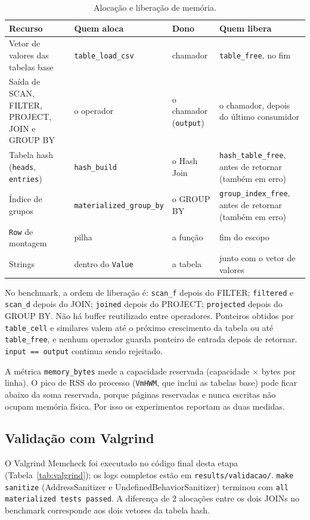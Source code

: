 \documentclass[11pt,a4paper]{article}
\begin{document}
\begin{table}[H]
\centering
\small
\begin{tabular}{@{}p{4.2cm}p{3.6cm}p{2.9cm}p{4.6cm}@{}}
\toprule
Recurso & Quem aloca & Dono & Quem libera \\
\midrule
Vetor de valores das tabelas base & \texttt{table\_load\_csv} & chamador & \texttt{table\_free}, no fim \\
Saída de SCAN, FILTER, PROJECT, JOIN e GROUP BY & o operador & o chamador (\texttt{output}) & o chamador, depois do último consumidor \\
Tabela hash (\texttt{heads}, \texttt{entries}) & \texttt{hash\_build} & o Hash Join & \texttt{hash\_table\_free}, antes de retornar (também em erro) \\
Índice de grupos & \texttt{materialized\_\allowbreak group\_by} & o GROUP BY & \texttt{group\_index\_free}, antes de retornar (também em erro) \\
\texttt{Row} de montagem & pilha & a função & fim do escopo \\
Strings & dentro do \texttt{Value} & a tabela & junto com o vetor de valores \\
\bottomrule
\end{tabular}
\caption{Alocação e liberação de memória.}
\label{tab:posse}
\end{table}

No benchmark, a ordem de liberação é: \texttt{scan\_f} depois do FILTER; \texttt{filtered} e \texttt{scan\_d} depois do JOIN; \texttt{joined} depois do PROJECT; \texttt{projected} depois do GROUP BY. Não há buffer reutilizado entre operadores. Ponteiros obtidos por \texttt{table\_cell} e similares valem até o próximo crescimento da tabela ou até \texttt{table\_free}, e nenhum operador guarda ponteiro de entrada depois de retornar. \texttt{input == output} continua sendo rejeitado.

A métrica \texttt{memory\_bytes} mede a capacidade reservada (capacidade $\times$ bytes por linha). O pico de RSS do processo (\texttt{VmHWM}, que inclui as tabelas base) pode ficar abaixo da soma reservada, porque páginas reservadas e nunca escritas não ocupam memória física. Por isso os experimentos reportam as duas medidas.

\subsection{Validação com Valgrind}\label{sec:valgrind}
O Valgrind Memcheck \cite{valgrind} foi executado no código final desta etapa (Tabela~\ref{tab:valgrind}); os logs completos estão em \texttt{results/validacao/}. \texttt{make sanitize} (AddressSanitizer e UndefinedBehaviorSanitizer) terminou com \texttt{all materialized tests passed}. A diferença de 2 alocações entre os dois JOINs no benchmark corresponde aos dois vetores da tabela hash.
\end{document}
